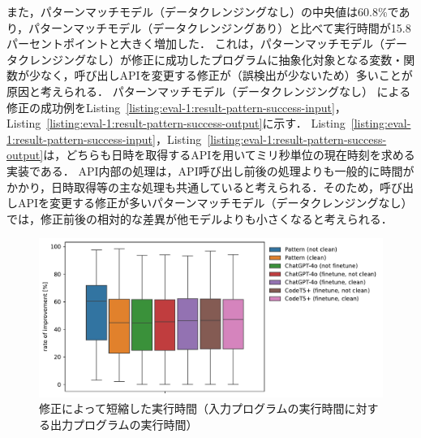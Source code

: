 \documentclass[11pt]{jreport}
\newcommand{\fixthree}[1]{#1}
\begin{document}
\fixthree{
また，パターンマッチモデル（データクレンジングなし）の中央値は60.8\%であり，パターンマッチモデル（データクレンジングあり）と比べて実行時間が15.8パーセントポイントと大きく増加した．
これは，パターンマッチモデル（データクレンジングなし）が修正に成功したプログラムに抽象化対象となる変数・関数が少なく，呼び出しAPIを変更する修正が（誤検出が少ないため）多いことが原因と考えられる．
パターンマッチモデル（データクレンジングなし）
による修正の成功例をListing~\ref{listing:eval-1:result-pattern-success-input}，Listing~\ref{listing:eval-1:result-pattern-success-output}に示す．
Listing~\ref{listing:eval-1:result-pattern-success-input}，Listing~\ref{listing:eval-1:result-pattern-success-output}は，どちらも日時を取得するAPIを用いてミリ秒単位の現在時刻を求める実装である．
API内部の処理は，API呼び出し前後の処理よりも一般的に時間がかかり，日時取得等の主な処理も共通していると考えられる．そのため，呼び出しAPIを変更する修正が多いパターンマッチモデル（データクレンジングなし）では，修正前後の相対的な差異が他モデルよりも小さくなると考えられる．
}



\begin{figure}[t]
\begin{center}
\includegraphics[width=1.0\linewidth]{Omori_fig/figure_rate.pdf}
\caption{修正によって短縮した実行時間（入力プログラムの実行時間に対する出力プログラムの実行時間）}
\label{fig:eval-1:result-fast-rate}
\end{center}
\end{figure}
\end{document}
